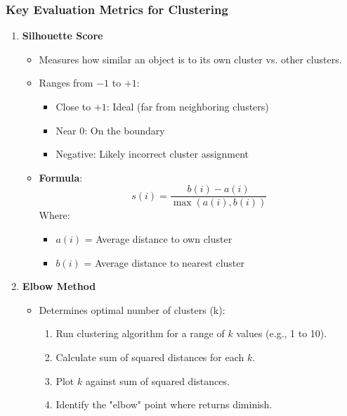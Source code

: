 \documentclass[aspectratio=169]{beamer}
\begin{document}
\begin{frame}[fragile]
    \frametitle{Key Evaluation Metrics for Clustering}

    \begin{enumerate}
        \item \textbf{Silhouette Score}
        \begin{itemize}
            \item Measures how similar an object is to its own cluster vs. other clusters.
            \item Ranges from $-1$ to $+1$:
            \begin{itemize}
                \item Close to $+1$: Ideal (far from neighboring clusters)
                \item Near $0$: On the boundary 
                \item Negative: Likely incorrect cluster assignment
            \end{itemize}
            \item \textbf{Formula}:
            \begin{equation}
            s(i) = \frac{b(i) - a(i)}{\max(a(i), b(i))}
            \end{equation}
            Where:
            \begin{itemize}
                \item $a(i)$ = Average distance to own cluster
                \item $b(i)$ = Average distance to nearest cluster
            \end{itemize}
        \end{itemize}

        \item \textbf{Elbow Method}
        \begin{itemize}
            \item Determines optimal number of clusters (k):
            \begin{enumerate}
                \item Run clustering algorithm for a range of $k$ values (e.g., 1 to 10).
                \item Calculate sum of squared distances for each $k$.
                \item Plot $k$ against sum of squared distances.
                \item Identify the "elbow" point where returns diminish.
            \end{enumerate}
        \end{itemize}
    \end{enumerate}
\end{frame}
\end{document}
